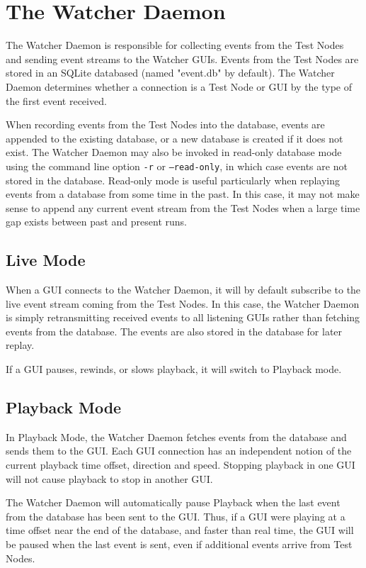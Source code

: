 \newpage
\label{watcherd}
\section{The Watcher Daemon}

The Watcher Daemon is responsible for collecting events from the Test Nodes and
sending event streams to the Watcher GUIs.  Events from the Test Nodes are
stored in an SQLite databased (named "event.db" by default).  The Watcher Daemon
determines whether a connection is a Test Node or GUI by the type of the first
event received.

When recording events from the Test Nodes into the database, events are
appended to the existing database, or a new database is created if it does not
exist.  The Watcher Daemon may also be invoked in read-only database mode using
the command line option {\tt -r} or {\tt --read-only}, in which case events are not stored
in the database.  Read-only mode is useful particularly when replaying events
from a database from some time in the past.  In this case, it may not make
sense to append any current event stream from the Test Nodes when a large time
gap exists between past and present runs.

\subsection{Live Mode}

When a GUI connects to the Watcher Daemon, it will by default subscribe to the
live event stream coming from the Test Nodes.  In this case, the Watcher Daemon
is simply retransmitting received events to all listening GUIs rather than
fetching events from the database.  The events are also stored in the database
for later replay.

If a GUI pauses, rewinds, or slows playback, it will switch to Playback mode.

\subsection{Playback Mode}

In Playback Mode, the Watcher Daemon fetches events from the database and sends
them to the GUI.  Each GUI connection has an independent notion of the current
playback time offset, direction and speed.  Stopping playback in one GUI will
not cause playback to stop in another GUI.

The Watcher Daemon will automatically pause Playback when the last event from
the database has been sent to the GUI.  Thus, if a GUI were playing at a time
offset near the end of the database, and faster than real time, the GUI will be
paused when the last event is sent, even if additional events arrive from Test
Nodes.

